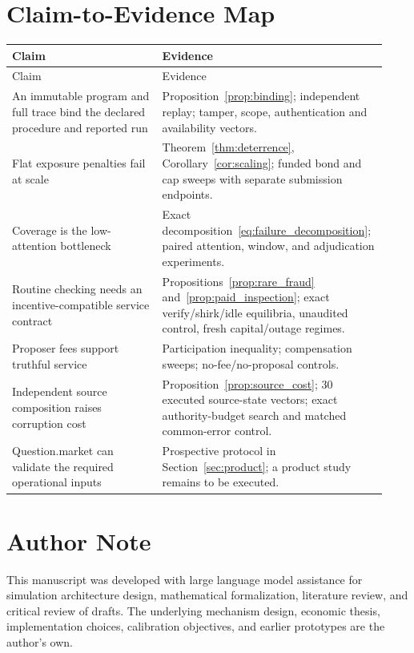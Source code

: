 \documentclass[10pt]{article}
\begin{document}
\section{Claim-to-Evidence Map}

\begin{longtable}{@{}p{0.39\linewidth}p{0.54\linewidth}@{}}
\toprule
Claim & Evidence \\
\midrule
\endfirsthead
\toprule Claim & Evidence \\
\midrule
\endhead
An immutable program and full trace bind the declared procedure and reported run & Proposition~\ref{prop:binding}; independent replay; tamper, scope, authentication and availability vectors. \\
Flat exposure penalties fail at scale & Theorem~\ref{thm:deterrence}, Corollary~\ref{cor:scaling}; funded bond and cap sweeps with separate submission endpoints. \\
Coverage is the low-attention bottleneck & Exact decomposition~\eqref{eq:failure_decomposition}; paired attention, window, and adjudication experiments. \\
Routine checking needs an incentive-compatible service contract & Propositions~\ref{prop:rare_fraud} and~\ref{prop:paid_inspection}; exact verify/shirk/idle equilibria, unaudited control, fresh capital/outage regimes. \\
Proposer fees support truthful service & Participation inequality; compensation sweeps; no-fee/no-proposal controls. \\
Independent source composition raises corruption cost & Proposition~\ref{prop:source_cost}; 30 executed source-state vectors; exact authority-budget search and matched common-error control. \\
Question.market can validate the required operational inputs & Prospective protocol in Section~\ref{sec:product}; a product study remains to be executed. \\
\bottomrule
\end{longtable}

\section*{Author Note}

This manuscript was developed with large language model assistance for simulation architecture design, mathematical formalization, literature review, and critical review of drafts. The underlying mechanism design, economic thesis, implementation choices, calibration objectives, and earlier prototypes are the author's own.
\end{document}

